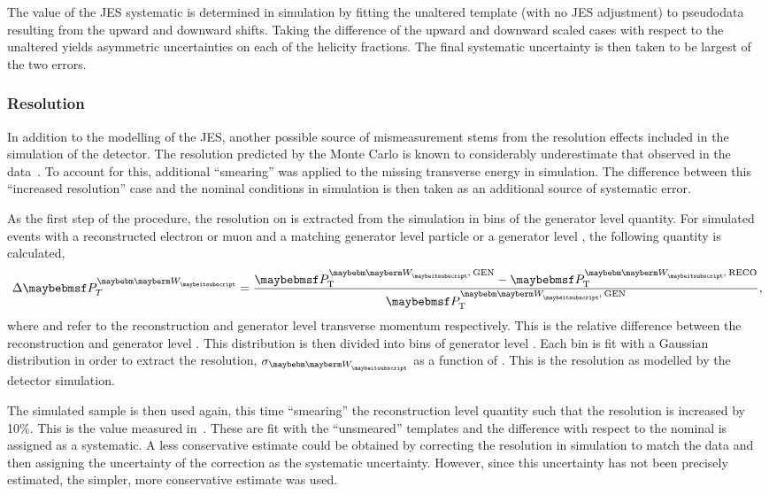 The value of the \ac{JES} systematic is determined in simulation by
fitting the unaltered template (with no \ac{JES} adjustment) to
pseudodata resulting from the upward and downward shifts. Taking the difference
of the upward and downward scaled cases with respect to the unaltered yields
asymmetric uncertainties on each of the helicity fractions. The final systematic
uncertainty is then taken to be largest of the two errors.

\subsubsection{\MET Resolution}
In addition to the modelling of the \ac{JES}, another possible source of
mismeasurement stems from the resolution effects included in the simulation of
the detector. The resolution predicted by the Monte Carlo is known to
considerably underestimate that observed in the
data~\cite{cms_met_paper,cms_met_pas}. To account for this, additional
``smearing'' was applied to the missing transverse energy in simulation. The
difference between this ``increased resolution'' case and the nominal conditions
in simulation is then taken as an additional source of systematic error.

As the first step of the procedure, the resolution on \PtW is extracted from the
simulation in bins of the generator level \PtW quantity. For simulated \Wjets
events with a reconstructed electron or muon and a matching generator level
particle or a generator level \Ptau, the following quantity is calculated,
\begin{equation*}
\Delta\PtW = \frac{\PtWgen - \PtWreco}{\PtWgen},
\end{equation*}
where \PtWreco and \PtWgen refer to the reconstruction and generator level \PW
transverse momentum respectively. This is the relative difference between the
reconstruction and generator level \PtW. This distribution is then divided into
bins of generator level \PtW. Each bin is fit with a Gaussian distribution in
order to extract the resolution, $\sigma_{\PW}$ as a function of \PtW. This is
the \PtW resolution as modelled by the detector simulation.

The simulated sample is then used again, this time ``smearing'' the
reconstruction level \PtW quantity such that the resolution is increased by
10\%. This is the value measured in~\cite{cms_met_paper}. These are fit with the
``unsmeared'' templates and the difference with respect to the nominal is
assigned as a systematic. A less conservative estimate could be obtained by
correcting the resolution in simulation to match the data and then assigning the
uncertainty of the correction as the systematic uncertainty. However, since this
uncertainty has not been precisely estimated, the simpler, more conservative
estimate was used.

